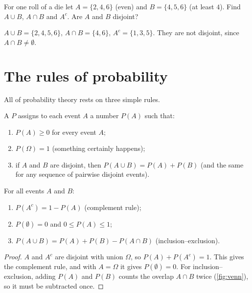 \begin{exercise}
For one roll of a die let $A = \{2, 4, 6\}$ (even) and $B = \{4, 5, 6\}$ (at
least $4$). Find $A \cup B$, $A \cap B$ and $A^c$. Are $A$ and $B$ disjoint?
\end{exercise}
\begin{solution}
$A \cup B = \{2, 4, 5, 6\}$, $A \cap B = \{4, 6\}$, $A^c = \{1, 3, 5\}$. They are
not disjoint, since $A \cap B \neq \emptyset$.
\end{solution}

\section{The rules of probability}\label{sec:probability-rules}

All of probability theory rests on three simple rules.

\begin{definition}\label{def:axioms}
A  $P$ assigns to each event $A$ a number $P(A)$ such that:
\begin{enumerate}
  \item $P(A) \ge 0$ for every event $A$;
  \item $P(\Omega) = 1$ (something certainly happens);
  \item if $A$ and $B$ are disjoint, then $P(A \cup B) = P(A) + P(B)$ (and the
    same for any sequence of pairwise disjoint events).
\end{enumerate}
\end{definition}

\begin{theorem}\label{thm:probability-rules}
For all events $A$ and $B$:
\begin{enumerate}
  \item $P(A^c) = 1 - P(A)$ \quad (complement rule);
  \item $P(\emptyset) = 0$ and $0 \le P(A) \le 1$;
  \item $P(A \cup B) = P(A) + P(B) - P(A \cap B)$ \quad (inclusion--exclusion).
\end{enumerate}
\end{theorem}

\begin{proof}
$A$ and $A^c$ are disjoint with union $\Omega$, so $P(A) + P(A^c) = 1$. This gives
the complement rule, and with $A = \Omega$ it gives $P(\emptyset) = 0$. For
inclusion--exclusion, adding $P(A)$ and $P(B)$ counts the overlap $A \cap B$
twice (\cref{fig:venn}), so it must be subtracted once.
\end{proof}

